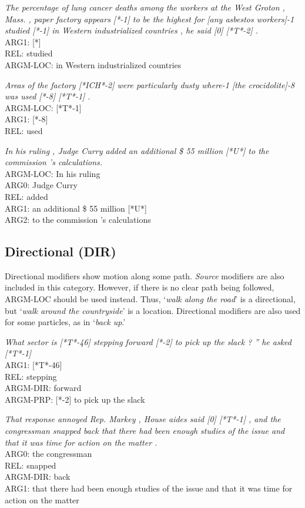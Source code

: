 \documentclass[11pt]{report}
\begin{document}
\textit{The percentage of lung cancer deaths among the workers at the West Groton , Mass. , paper factory appears [*-1] to be the highest for [any asbestos workers]-1 studied [*-1] in Western industrialized countries , he said [0] [*T*-2] .}\\
ARG1: [*]   \\
REL: studied\\ 
ARGM-LOC: in Western industrialized countries

\textit{Areas of the factory [*ICH*-2] were particularly dusty where-1 [the crocidolite]-8 was used [*-8] [*T*-1] .}\\
ARGM-LOC:        [*T*-1]   \\
ARG1:        [*-8]   \\
REL:        used 

\textit{In his ruling , Judge Curry added an additional \$ 55 million [*U*] to the commission 's calculations.}\\
ARGM-LOC:        In his ruling\\ 
ARG0:        Judge Curry \\
REL:        added \\
ARG1:        an additional \$ 55 million [*U*] \\
ARG2:        to the commission 's calculations

\subsection{Directional (DIR)}
\label{ssec: DIR}

Directional modifiers show motion along some path. \textit{Source} modifiers are also included in this category.  However, if there is no clear path being followed, ARGM-LOC should be used instead. Thus, `\textit{walk along the road}' is a directional, but `\textit{walk around the countryside}' is a location. Directional modifiers are also used for some particles, as in `\textit{back up}.'

\textit{What sector is [*T*-46] stepping forward [*-2] to pick up the slack ? '' he asked [*T*-1] }\\
ARG1:        [*T*-46]\\   
REL:        stepping \\
ARGM-DIR:        forward\\ 
ARGM-PRP:        [*-2] to pick up the slack

\textit{That response annoyed Rep. Markey , House aides said [0] [*T*-1] , and the congressman snapped back that there had been enough studies of the issue and that it was time for action on the matter .}\\
ARG0:        the congressman \\
REL:            snapped \\
ARGM-DIR:        back \\
ARG1:        that there had been enough studies of the issue and that it was time   for action on the matter
\end{document}
